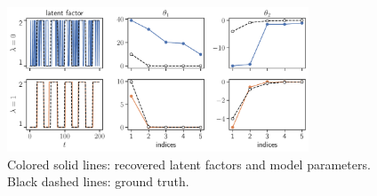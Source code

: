 \documentclass[a0]{a0poster}
\begin{document}
\begin{textblock}{7}
\[\]
\begin{figure}
    \centering
    \includegraphics[width=0.8\textwidth]{media/hier_forget_q_learning.pdf}
    \caption{\small
        Colored solid lines: recovered latent factors and model parameters.
        Black dashed lines: ground truth.
    }
\end{figure}


\end{textblock}
\end{document}
